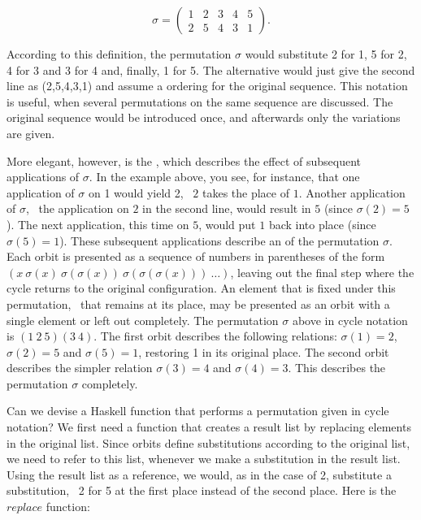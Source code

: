 \documentclass{scrreprt}
\begin{document}
\[
\sigma = \begin{pmatrix}
         1 & 2 & 3 & 4 & 5 \\
         2 & 5 & 4 & 3 & 1 
         \end{pmatrix}.
\]

According to this definition,
the permutation $\sigma$ would
substitute 2 for 1, 5 for 2, 4 for 3 and 3 for 4 
and, finally, 1 for 5.
The alternative  
would just give the second line as (2,5,4,3,1)
and assume a  ordering for the original sequence.
This notation is useful, when several permutations
on the same sequence are discussed.
The original sequence would be introduced once,
and afterwards only the variations are given.

More elegant, however, is the ,
which describes the effect of subsequent
applications of $\sigma$. 
In the example above, you see, for instance,
that one application of $\sigma$ on 1 would yield 2,
\ie\ $2$ takes the place of $1$.
Another application of $\sigma$,
\ie\ the application on $2$ in the second line,
would result in $5$ (since $\sigma(2) = 5$).
The next application, this time on $5$,
would put $1$ back into place (since $\sigma(5) = 1$).
These subsequent applications describe an 
of the permutation $\sigma$.
Each orbit is presented
as a sequence of numbers in parentheses of the form
$(x~\sigma(x)~\sigma(\sigma(x))~\sigma(\sigma(\sigma(x)))~\dots)$,
leaving out the final step 
where the cycle returns to the original configuration.
An element that is fixed under this permutation,
\ie\ that remains at its place,
may be presented as an orbit with a single element
or left out completely.
The permutation $\sigma$ above in cycle notation is
$(1~2~5)(3~4)$.
The first orbit describes the following relations:
$\sigma(1) = 2$, $\sigma(2) = 5$
and $\sigma(5) = 1$, restoring 1 in its original place.
The second orbit describes the simpler relation
$\sigma(3) = 4$ and $\sigma(4) = 3$.
This describes the permutation $\sigma$ 
completely.

Can we devise a Haskell function
that performs a permutation given in cycle notation?
We first need a function that 
creates a result list by replacing
elements in the original list.
Since orbits define substitutions
according to the original list,
we need to refer to this list,
whenever we make a substitution in the result list.
Using the result list as a reference,
we would, as in the case of 2,
substitute a substitution, 
\eg\ 2 for 5 at the first place
instead of the second place.
Here is the $replace$ function:
\end{document}
